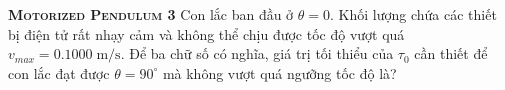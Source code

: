 \begin{problem}
\textbf{\textsc{Motorized Pendulum 3}}
Con lắc ban đầu ở $\theta=0$. Khối lượng chứa các thiết bị điện tử rất nhạy cảm và không thể chịu được tốc độ vượt quá $v_{max}=0.1000\;\mathrm{m/s}$. Để ba chữ số có nghĩa, giá trị tối thiểu của $\tau_0$ cần thiết để con lắc đạt được $\theta=90^{\circ}$ mà không vượt quá ngưỡng tốc độ là?

\end{problem}